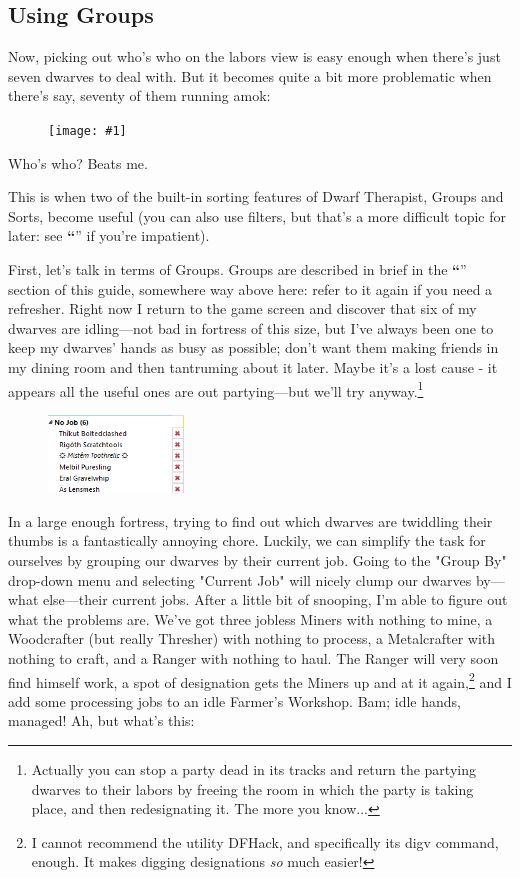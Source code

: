\documentclass[]{article}
\newcommand{\jump}[1] {\textbf{``\nameref{sec:#1}}''}
\newcommand{\fullfigure}[1] {
\begin{figure}[h!]
\texttt{[image: \#1]}
\end{figure}
}
\newcommand{\fullfigurecaption}[1] {
\begin{center}
\vspace{-12pt}
#1
\end{center}
}
\begin{document}
\newpage
\subsection{Using Groups}
\label{sec:Using Groups}

Now, picking out who's who on the labors view is easy enough when there's just seven dwarves to deal
with. But it becomes quite a bit more problematic when there's say, seventy of them running amok:
\fullfigure{Sec2Fig6}
\fullfigurecaption{Who's who? Beats me.}

This is when two of the built-in sorting features of Dwarf Therapist, Groups and Sorts,  become useful
(you can also use filters, but that's a more difficult topic for later: see 
\jump{Filter Scripts} if you're impatient).

First, let's talk in terms of Groups. Groups are described in brief in the \jump{Group
By and Filters} section of this guide, somewhere way above here: refer to it again if you need a
refresher. Right now I return to the game screen and discover that six of my dwarves are idling---not bad
in fortress of this size, but I've always been one to keep my dwarves' hands as busy as possible; don't
want them making friends in my dining room and then tantruming about it later. Maybe it's a lost cause -
it appears all the useful ones are out partying---but we'll try anyway.\footnote{Actually you can stop a
party dead in its tracks and return the partying dwarves to their labors by freeing the room in which the
party is taking place, and then redesignating it. The more you know...}

\begin{figure}
\vspace{-20pt}
  \begin{center}
    \includegraphics[width=0.32\textwidth]{Sec2Fig7}
  \end{center}
\vspace{-10pt}
\end{figure}
In a large enough fortress, trying to find out which dwarves are twiddling their thumbs is a
fantastically annoying chore. Luckily, we can simplify the task for ourselves by grouping our dwarves by
their current job. Going to the "Group By" drop-down menu and selecting "Current Job" will nicely clump
our dwarves by---what else---their current jobs. After a little bit of snooping, I'm able to figure out
what the problems are. We've got three jobless Miners with nothing to mine, a Woodcrafter (but really
Thresher) with nothing to process, a Metalcrafter with nothing to craft, and a Ranger with nothing to
haul. The Ranger will very soon find himself work, a spot of designation gets the Miners up and at it
again,\footnote{I cannot recommend the utility DFHack, and specifically its digv command, enough. It
makes digging designations \emph{so} much easier!} and I add some processing jobs to an idle Farmer's
Workshop. Bam; idle hands, managed! Ah, but what's this:
\end{document}
